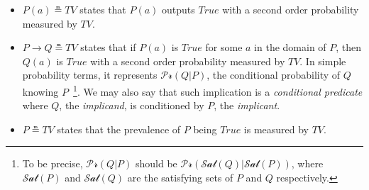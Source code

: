 \documentclass[runningheads]{llncs}
\newcommand{\SP}{\;\;\;}
\newcommand{\TTrue}{\textit{True}}
\newcommand{\TEval}{\textit{Evaluation}}
\newcommand{\TLamb}{\textit{Lambda}}
\newcommand{\TImpl}{\textit{Implication}}
\newcommand{\TTV}{\textit{TV}}
\newcommand{\TBTV}{\langle \TTV \rangle}
\newcommand{\sat}{\mathcal{Sat}}
\newcommand{\prob}{\mathcal{Pr}}
\newcommand{\limp}{\rightarrow}
\begin{document}
\begin{itemize}
\item $P(a) \measeq \TTV$ states that $P(a)$ outputs $\TTrue$ with a
  second order probability measured by $\TTV$.
\item
  $P \limp Q \measeq \TTV$ states that if $P(a)$ is $\TTrue$ for some
  $a$ in the domain of $P$, then $Q(a)$ is $\TTrue$ with a second
  order probability measured by $\TTV$.  In simple probability terms,
  it represents $\prob(Q|P)$, the conditional probability of $Q$
  knowing $P$~\footnote{To be precise, $\prob(Q|P)$ should be
    $\prob(\sat(Q)|\sat(P))$, where $\sat(P)$ and $\sat(Q)$ are the
    satisfying sets of $P$ and $Q$ respectively.}.  We may also say
  that such implication is a \emph{conditional predicate} where $Q$,
  the \emph{implicand}, is conditioned by $P$, the \emph{implicant}.
\item $P \measeq \TTV$ states that the prevalence of $P$ being
  $\TTrue$ is measured by $\TTV$.
\end{itemize}
\end{document}
